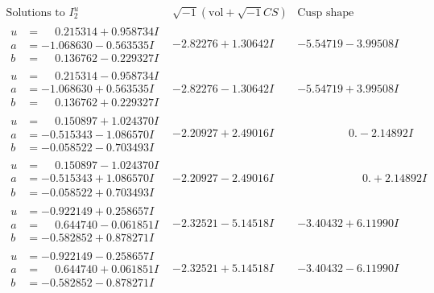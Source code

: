 \documentclass[1p]{elsarticle_modified}
\theoremstyle{definition}
\newcommand{\I}{\sqrt{-1}}
\begin{document}
$$\begin{array}{c|c|c}  
\text{Solutions to }I^u_{2}& \I (\text{vol} + \sqrt{-1}CS) & \text{Cusp shape}\\
 \hline 
\begin{aligned}
u &= \phantom{-}0.215314 + 0.958734 I \\
a &= -1.068630 - 0.563535 I \\
b &= \phantom{-}0.136762 - 0.229327 I\end{aligned}
 & -2.82276 + 1.30642 I & -5.54719 - 3.99508 I \\ \hline\begin{aligned}
u &= \phantom{-}0.215314 - 0.958734 I \\
a &= -1.068630 + 0.563535 I \\
b &= \phantom{-}0.136762 + 0.229327 I\end{aligned}
 & -2.82276 - 1.30642 I & -5.54719 + 3.99508 I \\ \hline\begin{aligned}
u &= \phantom{-}0.150897 + 1.024370 I \\
a &= -0.515343 - 1.086570 I \\
b &= -0.058522 - 0.703493 I\end{aligned}
 & -2.20927 + 2.49016 I & \phantom{-0.000000 } 0. - 2.14892 I \\ \hline\begin{aligned}
u &= \phantom{-}0.150897 - 1.024370 I \\
a &= -0.515343 + 1.086570 I \\
b &= -0.058522 + 0.703493 I\end{aligned}
 & -2.20927 - 2.49016 I & \phantom{-0.000000 -}0. + 2.14892 I \\ \hline\begin{aligned}
u &= -0.922149 + 0.258657 I \\
a &= \phantom{-}0.644740 - 0.061851 I \\
b &= -0.582852 + 0.878271 I\end{aligned}
 & -2.32521 - 5.14518 I & -3.40432 + 6.11990 I \\ \hline\begin{aligned}
u &= -0.922149 - 0.258657 I \\
a &= \phantom{-}0.644740 + 0.061851 I \\
b &= -0.582852 - 0.878271 I\end{aligned}
 & -2.32521 + 5.14518 I & -3.40432 - 6.11990 I \\ \hline\begin{aligned}

\end{aligned}
\end{array}$$
\end{document}
